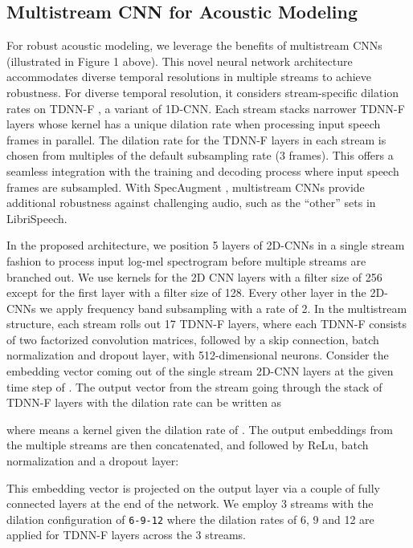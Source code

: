 \documentclass[a4paper]{article}
\begin{document}
\subsection{Multistream CNN for Acoustic Modeling}
For robust acoustic modeling, we leverage the benefits of multistream CNNs \cite{han20} (illustrated in Figure 1 above). This novel neural network architecture accommodates diverse temporal resolutions in multiple streams to achieve robustness. For diverse temporal resolution, it considers stream-specific dilation rates on TDNN-F \cite{povey18tdnnf}, a variant of 1D-CNN. Each stream stacks narrower TDNN-F layers whose kernel has a unique dilation rate when processing input speech frames in parallel. The dilation rate for the TDNN-F layers in each stream is chosen from multiples of the default subsampling rate (3 frames). This offers a seamless integration with the training and decoding process where input speech frames are subsampled. With SpecAugment \cite{specaugment}, multistream CNNs provide additional robustness against challenging audio, such as the ``other'' sets in LibriSpeech. 

In the proposed architecture, we position 5 layers of 2D-CNNs in a single stream fashion to process input log-mel spectrogram before multiple streams are branched out. We use  kernels for the 2D CNN layers with a filter size of 256 except for the first layer with a filter size of 128. Every other layer in the 2D-CNNs we apply frequency band subsampling with a rate of 2. In the multistream structure, each stream rolls out 17 TDNN-F layers, where each TDNN-F consists of two  factorized convolution matrices, followed by a skip connection, batch normalization and dropout layer, with 512-dimensional neurons. Consider the embedding vector  coming out of the single stream 2D-CNN layers at the given time step of . The output vector  from the stream  going through the stack of TDNN-F layers with the dilation rate  can be written as

where  means a  kernel given the dilation rate of . The output embeddings from the multiple streams are then concatenated, and followed by ReLu, batch normalization and a dropout layer:

This embedding vector is projected on the output layer via a couple of fully connected layers at the end of the network. We employ 3 streams with the dilation configuration of \texttt{6-9-12} where the dilation rates of 6, 9 and 12 are applied for TDNN-F layers across the 3 streams.     
\end{document}

